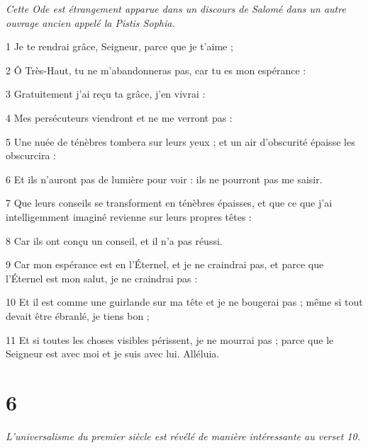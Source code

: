 \par \textit{Cette Ode est étrangement apparue dans un discours de Salomé dans un autre ouvrage ancien appelé la Pistis Sophia.}

\par 1 Je te rendrai grâce, Seigneur, parce que je t'aime ;
\par 2 Ô Très-Haut, tu ne m'abandonneras pas, car tu es mon espérance :
\par 3 Gratuitement j'ai reçu ta grâce, j'en vivrai :
\par 4 Mes persécuteurs viendront et ne me verront pas :
\par 5 Une nuée de ténèbres tombera sur leurs yeux ; et un air d'obscurité épaisse les obscurcira :
\par 6 Et ils n'auront pas de lumière pour voir : ils ne pourront pas me saisir.
\par 7 Que leurs conseils se transforment en ténèbres épaisses, et que ce que j'ai intelligemment imaginé revienne sur leurs propres têtes :
\par 8 Car ils ont conçu un conseil, et il n'a pas réussi.
\par 9 Car mon espérance est en l'Éternel, et je ne craindrai pas, et parce que l'Éternel est mon salut, je ne craindrai pas :
\par 10 Et il est comme une guirlande sur ma tête et je ne bougerai pas ; même si tout devait être ébranlé, je tiens bon ;
\par 11 Et si toutes les choses visibles périssent, je ne mourrai pas ; parce que le Seigneur est avec moi et je suis avec lui. Alléluia.

\chapter{6}

\par \textit{L'universalisme du premier siècle est révélé de manière intéressante au verset 10.}

